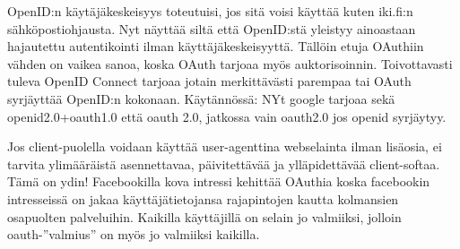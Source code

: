 \documentclass[finnish,gradu]{tktltiki}
\begin{document}
    OpenID:n käytäjäkeskeisyys toteutuisi, jos sitä voisi käyttää kuten iki.fi:n sähköpostiohjausta. Nyt näyttää siltä että OpenID:stä yleistyy ainoastaan hajautettu autentikointi ilman käyttäjäkeskeisyyttä. Tällöin etuja OAuthiin vähden on vaikea sanoa, koska OAuth tarjoaa myös auktorisoinnin. Toivottavasti tuleva OpenID Connect tarjoaa jotain merkittävästi parempaa tai OAuth syrjäyttää OpenID:n kokonaan. Käytännössä: NYt google tarjoaa sekä openid2.0+oauth1.0 että oauth 2.0, jatkossa vain oauth2.0 jos openid syrjäytyy.

  Jos client-puolella voidaan käyttää user-agenttina webselainta ilman lisäosia, ei tarvita ylimääräistä asennettavaa, päivitettävää ja ylläpidettävää client-softaa. Tämä on ydin! Facebookilla kova intressi kehittää OAuthia koska facebookin intresseissä on jakaa käyttäjätietojansa rajapintojen kautta kolmansien osapuolten palveluihin. Kaikilla käyttäjillä on selain jo valmiiksi, jolloin oauth-''valmius'' on myös jo valmiiksi kaikilla.







\lastpage
\end{document}
